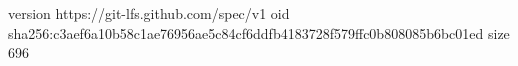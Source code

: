 version https://git-lfs.github.com/spec/v1
oid sha256:c3aef6a10b58c1ae76956ae5c84cf6ddfb4183728f579ffc0b808085b6bc01ed
size 696
